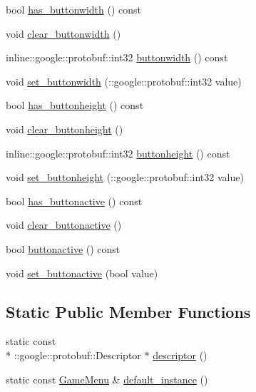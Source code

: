 \begin{DoxyCompactItemize}
\item 
bool \hyperlink{class_game_menu_af2a429e3dea81aefb27e507b34a6b450}{has\-\_\-buttonwidth} () const 
\item 
void \hyperlink{class_game_menu_a530076caa9483b223c89ba806f1ab996}{clear\-\_\-buttonwidth} ()
\item 
inline\-::google\-::protobuf\-::int32 \hyperlink{class_game_menu_a129d9ca0747a44437f0bb7181cd92fba}{buttonwidth} () const 
\item 
void \hyperlink{class_game_menu_a56aa7ceffcc93eb338206c82127b7f62}{set\-\_\-buttonwidth} (\-::google\-::protobuf\-::int32 value)
\item 
bool \hyperlink{class_game_menu_a5f109f581d3786a458d156260a2acb84}{has\-\_\-buttonheight} () const 
\item 
void \hyperlink{class_game_menu_a9d6ca35aac1c8addef27536bb63c691f}{clear\-\_\-buttonheight} ()
\item 
inline\-::google\-::protobuf\-::int32 \hyperlink{class_game_menu_a0d6c040f3b994ab558e2d2dbc11fcef0}{buttonheight} () const 
\item 
void \hyperlink{class_game_menu_ae1aa83ed7078237a0914bcd24964d446}{set\-\_\-buttonheight} (\-::google\-::protobuf\-::int32 value)
\item 
bool \hyperlink{class_game_menu_a28214c378a1acdefc8d85d8dd360939b}{has\-\_\-buttonactive} () const 
\item 
void \hyperlink{class_game_menu_a95b04ee1a6c6677bb225c3797d9d8061}{clear\-\_\-buttonactive} ()
\item 
bool \hyperlink{class_game_menu_ac53f3dde12a642d330498c33ecb1386f}{buttonactive} () const 
\item 
void \hyperlink{class_game_menu_af3fe74b06fabc19c5df391917ace597b}{set\-\_\-buttonactive} (bool value)
\end{DoxyCompactItemize}
\subsection*{Static Public Member Functions}
\begin{DoxyCompactItemize}
\item 
static const \\*
\-::google\-::protobuf\-::\-Descriptor $\ast$ \hyperlink{class_game_menu_a9a58d7e3eed9e066adc5b407a36ba292}{descriptor} ()
\item 
static const \hyperlink{class_game_menu}{Game\-Menu} \& \hyperlink{class_game_menu_afeb4b86432ba501c5c1627410b0848ad}{default\-\_\-instance} ()
\end{DoxyCompactItemize}
